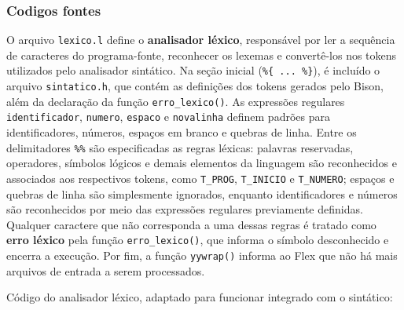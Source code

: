 \documentclass[
  brazilian,
  letterpaper,
]{book}
\theoremstyle{plain}
\theoremstyle{definition}
\theoremstyle{remark}
\begin{document}
\subsubsection{Codigos fontes}\label{codigos-fontes}

O arquivo \texttt{lexico.l} define o \textbf{analisador léxico},
responsável por ler a sequência de caracteres do programa-fonte,
reconhecer os lexemas e convertê-los nos tokens utilizados pelo
analisador sintático. Na seção inicial (\texttt{\%\{\ ...\ \%\}}), é
incluído o arquivo \texttt{sintatico.h}, que contém as definições dos
tokens gerados pelo Bison, além da declaração da função
\texttt{erro\_lexico()}. As expressões regulares \texttt{identificador},
\texttt{numero}, \texttt{espaco} e \texttt{novalinha} definem padrões
para identificadores, números, espaços em branco e quebras de linha.
Entre os delimitadores \texttt{\%\%} são especificadas as regras
léxicas: palavras reservadas, operadores, símbolos lógicos e demais
elementos da linguagem são reconhecidos e associados aos respectivos
tokens, como \texttt{T\_PROG}, \texttt{T\_INICIO} e \texttt{T\_NUMERO};
espaços e quebras de linha são simplesmente ignorados, enquanto
identificadores e números são reconhecidos por meio das expressões
regulares previamente definidas. Qualquer caractere que não corresponda
a uma dessas regras é tratado como \textbf{erro léxico} pela função
\texttt{erro\_lexico()}, que informa o símbolo desconhecido e encerra a
execução. Por fim, a função \texttt{yywrap()} informa ao Flex que não há
mais arquivos de entrada a serem processados.

Código do analisador léxico, adaptado para funcionar integrado com o
sintático:
\end{document}
